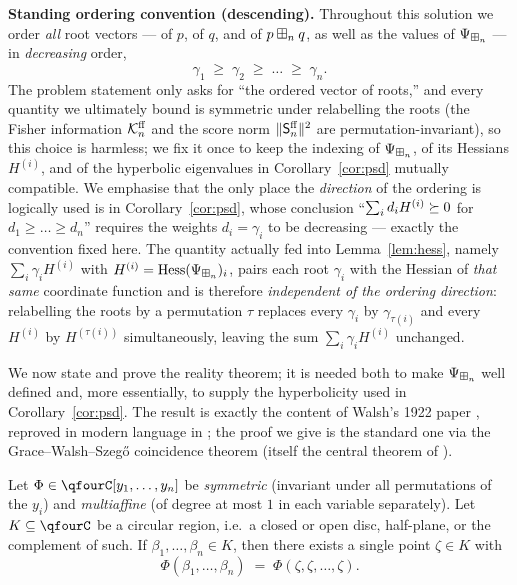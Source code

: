 \smallskip
\noindent\textbf{Standing ordering convention (descending).}
Throughout this solution we order \emph{all} root vectors --- of $p$, of $q$, and
of $p\boxplus_n q$, as well as the values of $\Psi_{\boxplus_n}$ --- in
\emph{decreasing} order,
\[
\gamma_1\;\ge\;\gamma_2\;\ge\;\dots\;\ge\;\gamma_n .
\]
The problem statement only asks for ``the ordered vector of roots,'' and every
quantity we ultimately bound is symmetric under relabelling the roots
(the Fisher information $\mathcal{K}^{\mathrm{ff}}_n$ and the score norm $\|\mathsf{S}^{\mathrm{ff}}_n\|^2$ are
permutation-invariant), so this choice is harmless; we fix it once to keep the
indexing of $\Psi_{\boxplus_n}$, of its Hessians $H^{(i)}$, and of the hyperbolic
eigenvalues in Corollary~\ref{cor:psd} mutually compatible. We emphasise that
the only place the \emph{direction} of the ordering is logically used is in
Corollary~\ref{cor:psd}, whose conclusion ``$\sum_i d_iH^{(i)}\succeq 0$ for
$d_1\ge\dots\ge d_n$'' requires the weights $d_i=\gamma_i$ to be decreasing ---
exactly the convention fixed here. The quantity actually fed into
Lemma~\ref{lem:hess}, namely $\sum_i\gamma_iH^{(i)}$ with
$H^{(i)}=\operatorname{Hess}(\Psi_{\boxplus_n})_i$, pairs each root $\gamma_i$ with the
Hessian of \emph{that same} coordinate function and is therefore
\emph{independent of the ordering direction}: relabelling the roots by a
permutation $\tau$ replaces every $\gamma_i$ by $\gamma_{\tau(i)}$ and every
$H^{(i)}$ by $H^{(\tau(i))}$ simultaneously, leaving the sum
$\sum_i\gamma_iH^{(i)}$ unchanged.

\smallskip
We now state and prove the reality theorem; it is needed both to make
$\Psi_{\boxplus_n}$ well defined and, more essentially, to supply the hyperbolicity
used in Corollary~\ref{cor:psd}. The result is exactly the content of Walsh's
1922 paper \cite{Walsh}, reproved in modern language in \cite{MSS22}; the proof
we give is the standard one via the Grace--Walsh--Szeg\H{o} coincidence theorem
(itself the central theorem of \cite{Walsh}).

\begin{qfourtheorem}\label{thm:gws}
Let $\Phi\in\qfourC[y_1,\dots,y_n]$ be \emph{symmetric} (invariant under all
permutations of the $y_i$) and \emph{multiaffine} (of degree at most $1$ in each
variable separately). Let $K\subseteq\qfourC$ be a circular region, i.e.\ a
closed or open disc, half-plane, or the complement of such. If
$\beta_1,\dots,\beta_n\in K$, then there exists a single point $\zeta\in K$ with
\[
\Phi(\beta_1,\dots,\beta_n)\;=\;\Phi(\zeta,\zeta,\dots,\zeta).
\]
\end{qfourtheorem}

